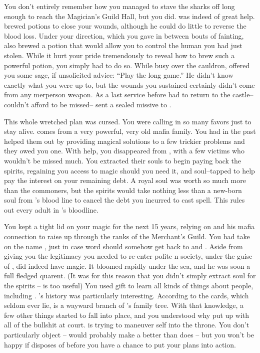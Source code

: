 \documentclass[char]{NeptuneBall}
\begin{document}
You don't entirely remember how you managed to stave the sharks off long enough to reach the Magician's Guild Hall, but you did. \cManta{} was indeed of great help. \cManta{\They} brewed potions to close your wounds, although he could do little to reverse the blood loss. Under your direction, which you gave in between bouts of fainting, \cManta{} also brewed a potion that would allow you to control the human \cSlave{\prince} you had just stolen. While it hurt your pride tremendously to reveal how to brew such a powerful potion, you simply had to do so. While busy over the cauldron, \cManta{} offered you some sage, if unsolicited advice: ``Play the long game.'' He didn't know exactly what you were up to, but the wounds you sustained certainly didn't come from any merperson weapon.  As a last service before \cManta{} had to return to the castle-- \cManta{\they} couldn't afford to be missed-- \cManta{} sent a sealed missive to \cPriest{}.

This whole wretched plan was cursed. You were calling in so many favors just to stay alive. \cPriest{} comes from a very powerful, very old mafia family. You had in the past helped them out by providing magical solutions to a few trickier problems and they owed you one.  With \cPriest{\their} help, you disappeared from \pAtlantis{}, with a few victims who wouldn't be missed much. You extracted their souls to begin paying back the spirits, regaining you access to magic should you need it, and soul--tapped \cSlave{} to help pay the interest on your remaining debt. A royal soul was worth so much more than the commoners, but the spirits would take nothing less than a new-born soul from \cAriel{}'s blood line to cancel the debt you incurred to cast \cAriel{\them} spell. This rules out every adult in \cAriel{}'s bloodline.

You kept a tight lid on your magic for the next 15 years, relying on \cPriest{} and his mafia connection to raise \cSlave{} up through the ranks of the Merchant's Guild. You had \cSlave{} take on the name \cSlave{\MYname}, just in case word should somehow get back to \cAriel{} and \cEric{}. Aside from giving you the legitimacy you needed to re-enter polite \pAtlantis{}n society, under the guise of \cWitch{\MYname}, \cSlave{} did indeed have magic. It bloomed rapidly under the sea, and he was soon a full fledged quarent. (It was for this reason that you didn't simply extract \cSlave{\their} soul for the spirits -- \cSlave{\they} is too useful) You used \cSlave{\them} gift to learn all kinds of things about people, including \cManta{}. \cManta{}'s history was particularly interesting. According to the cards, which seldom ever lie, \cManta{} is a wayward branch of \cKing{}'s family tree. With that knowledge, a few other things started to fall into place, and you understood why \cManta{} put up with all of the bullshit at court. \cManta{\They} is trying to maneuver \cManta{\them}self into the throne. You don't particularly object -- \cManta{\they} would probably make a better \cManta{\King} than \cKing{} does -- but you won't be happy if \cManta{\they} disposes of \cKing{} before you have a chance to put your plans into action.
\end{document}
